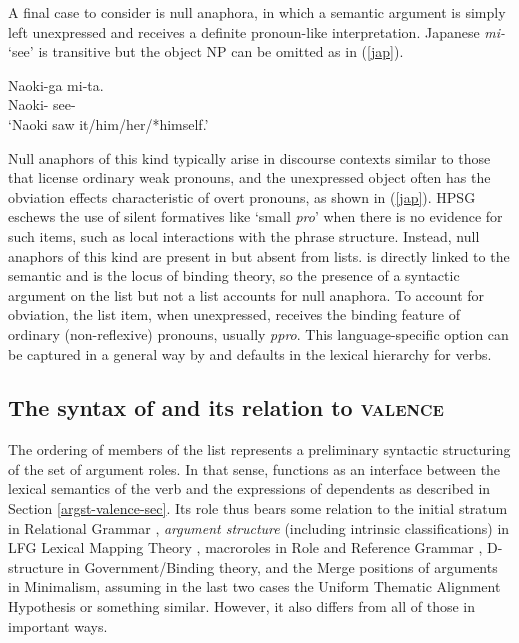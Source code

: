 \documentclass[output=paper
	        ,collection
	        ,collectionchapter
 	        ,biblatex
                ,babelshorthands
                ,newtxmath
                ,draftmode
                ,colorlinks, citecolor=brown
]{langscibook}
\begin{document}
A final case to consider is null anaphora, in which a semantic argument is simply left unexpressed and receives a definite pronoun-like interpretation.  Japanese \textit{mi-} `see' is transitive but the object NP can be omitted as in (\ref{jap}).

\begin{exe}
	\ex\label{jap}
		\gll Naoki-ga mi-ta.  \\
		Naoki- see-  \\
		\glt `Naoki saw it/him/her/*himself.'
\end{exe} 

\noindent
Null anaphors of this kind typically arise in discourse contexts similar to those that license ordinary weak pronouns, and the unexpressed object often has the obviation effects characteristic of overt pronouns,  as shown in (\ref{jap}).  HPSG eschews the use of silent formatives like `small \textit{pro}' when there is no evidence for such items, such as local interactions with the phrase structure.  Instead, null anaphors of this kind are present in \argst but absent from \val lists.  \argst is directly linked to the semantic \content and is the locus of binding theory, so the presence of a syntactic argument on the \argst list but not a \val list
 accounts for null anaphora.  To account for obviation, the \argst list item, when unexpressed, receives the binding feature of ordinary (non-reflexive) pronouns, usually \textit{ppro}.  This language-specific option can be captured in a general way by \val and \argst defaults in the lexical hierarchy for verbs.   

\subsection{The syntax of \argst and its relation to \textsc{valence}}
\label{argst-sec}


The ordering of members of the \argst list represents a preliminary syntactic structuring of the set of argument roles.  In that sense, \argst functions as an interface between the lexical semantics of the verb and the expressions of dependents as described in Section \ref{argst-valence-sec}.  Its role thus bears some relation to the initial stratum in Relational Grammar \citep{PerlmutterandPostal1984},  \textit{argument structure} (including intrinsic classifications) in LFG Lexical Mapping Theory  \citep{Bresnan+etal:2015}, macroroles in Role and Reference Grammar \citep{VanValinandLapolla1997}, D-structure in Government/Binding theory, and the Merge positions of arguments in Minimalism,  assuming in the last two cases the Uniform Thematic Alignment Hypothesis \citep{Baker1988} or something similar.  However, it also differs from all of those in important ways.  
\end{document}
